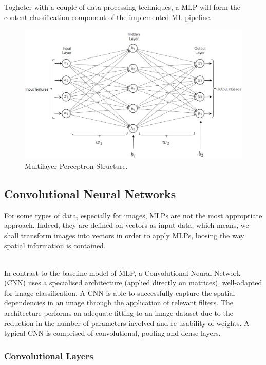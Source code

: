 Togheter with a couple of data processing techniques, a MLP will form the content classification component of the implemented ML pipeline. \\

\begin{figure}[H]
  \centering
  \includegraphics[scale = 0.35]{Images/mlp.png}
  \caption{Multilayer Perceptron Structure.}
  \label{Multilayer Perceptron}
\end{figure}

\subsection{Convolutional Neural Networks}

For some types of data, especially for images, MLPs are not the most appropriate approach. Indeed, they are defined on vectors as input data, which means, we shall transform images into vectors in order to apply MLPs, loosing the way spatial information is contained. \\\

In contrast to the baseline model of MLP, a Convolutional Neural Network (CNN) uses a specialised architecture (applied directly on matrices), well-adapted for image classification. A CNN is able to successfully capture the spatial dependencies in an image through the application of relevant filters. The architecture performs an adequate fitting to an image dataset due to the reduction in the number of parameters involved and re-usability of weights. A typical CNN is comprised of convolutional, pooling and dense layers. \\

\subsubsection*{Convolutional Layers}

